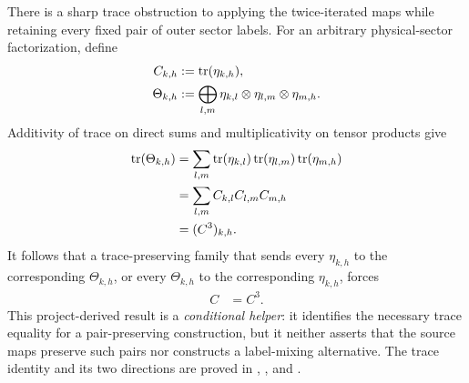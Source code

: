 \documentclass{article}
\begin{document}
There is a sharp trace obstruction to applying the twice-iterated maps while
retaining every fixed pair of outer sector labels. For an arbitrary
physical-sector factorization, define
\begin{align}
    C_{k,h}
        &:= \operatorname{tr}(\eta_{k,h}),
    \label{eq:cpgsv17_neighboring_trace_matrix}\\
    \Theta_{k,h}
        &:=
        \bigoplus_{l,m}
        \eta_{k,l}\otimes\eta_{l,m}\otimes\eta_{m,h}.
    \label{eq:cpgsv17_four_site_neighboring_operator}
\end{align}
Additivity of trace on direct sums and multiplicativity on tensor products
give
\begin{align}
    \operatorname{tr}(\Theta_{k,h})
        &= \sum_{l,m}
        \operatorname{tr}(\eta_{k,l})
        \operatorname{tr}(\eta_{l,m})
        \operatorname{tr}(\eta_{m,h})
    \label{eq:cpgsv17_four_site_trace_expansion}\\
        &= \sum_{l,m}C_{k,l}C_{l,m}C_{m,h}
    \label{eq:cpgsv17_four_site_trace_matrix_sum}\\
        &= (C^3)_{k,h}.
    \label{eq:cpgsv17_four_site_trace_cube}
\end{align}
It follows that a trace-preserving family that sends every $\eta_{k,h}$ to
the corresponding $\Theta_{k,h}$, or every $\Theta_{k,h}$ to the corresponding
$\eta_{k,h}$, forces
\begin{align}
    C
        &= C^3.
    \label{eq:cpgsv17_pair_preserving_trace_condition}
\end{align}
This project-derived result is a \emph{conditional helper}: it identifies the
necessary trace equality for a pair-preserving construction, but it neither
asserts that the source maps preserve such pairs nor constructs a label-mixing
alternative. The trace identity and its two directions are proved in
,
, and
.
\end{document}
